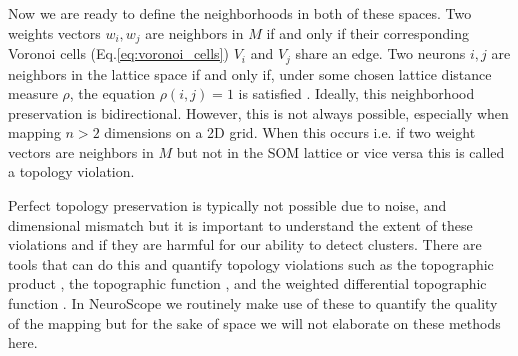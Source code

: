 Now we are ready to define the neighborhoods in both of these spaces. Two weights vectors $w_i, w_j$ are neighbors in $M$ if and only if their corresponding Voronoi cells (Eq.\ref{eq:voronoi_cells}) $V_i$ and $V_j$ share an edge. Two neurons $i,j$ are neighbors in the lattice space if and only if,  under some chosen lattice distance measure $\rho$, the equation $\rho (i,j) = 1$ is satisfied \cite{topology_preservation}.  
Ideally, this neighborhood preservation is bidirectional. However, this is not always possible, especially when mapping $n > 2$ dimensions on a 2D grid. When this occurs i.e. if two weight vectors are neighbors in $M$ but not in the SOM lattice or vice versa this is called a topology violation.

Perfect topology preservation is typically not possible due to noise, and dimensional mismatch but it is important to understand the extent of these violations and if they are harmful for our ability to detect clusters. There are tools that can do this and quantify topology violations such as the topographic product \cite{topographic_product}, the topographic function \cite{topographic_function}, and the weighted differential topographic function \cite{weighted_topo_function}.
In NeuroScope we routinely make use of these to quantify the quality of the mapping but for the sake of space we will not elaborate on these methods here.

